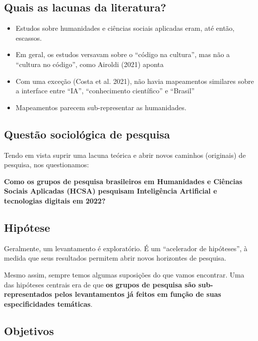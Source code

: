 \documentclass[
  brazilian,
  letterpaper,
  DIV=11,
  numbers=noendperiod]{scrartcl}
\providecommand{\tightlist}{%
  \setlength{\itemsep}{0pt}\setlength{\parskip}{0pt}}
\begin{document}
\subsection{Quais as lacunas da
literatura?}\label{quais-as-lacunas-da-literatura}

\begin{itemize}
\tightlist
\item
  Estudos sobre humanidades e ciências sociais aplicadas eram, até
  então, escassos.
\item
  Em geral, os estudos versavam sobre o ``código na cultura'', mas não a
  ``cultura no código'', como Airoldi (2021) aponta
\item
  Com uma exceção (Costa et al. 2021), não havia mapeamentos similares
  sobre a interface entre ``IA'', ``conhecimento científico'' e
  ``Brasil''
\item
  Mapeamentos parecem sub-representar as humanidades.
\end{itemize}

\subsection{Questão sociológica de
pesquisa}\label{questuxe3o-socioluxf3gica-de-pesquisa}

Tendo em vista suprir uma lacuna teórica e abrir novos caminhos
(originais) de pesquisa, nos questionamos:

\textbf{Como os grupos de pesquisa brasileiros em Humanidades e Ciências
Sociais Aplicadas (HCSA) pesquisam Inteligência Artificial e tecnologias
digitais em 2022?}

\subsection{Hipótese}\label{hipuxf3tese}

Geralmente, um levantamento é exploratório. É um ``acelerador de
hipóteses'', à medida que seus resultados permitem abrir novos
horizontes de pesquisa.

Mesmo assim, sempre temos algumas suposições do que vamos encontrar. Uma
das hipóteses centrais era de que \textbf{os grupos de pesquisa são
sub-representados pelos levantamentos já feitos em função de suas
especificidades temáticas}.

\subsection{Objetivos}\label{objetivos}
\end{document}
